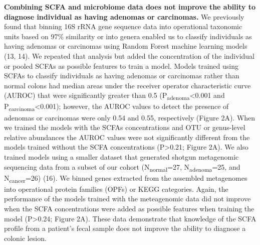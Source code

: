 \documentclass[11pt,]{article}
\begin{document}
\textbf{Combining SCFA and microbiome data does not improve the ability
to diagnose individual as having adenomas or carcinomas.} We previously
found that binning 16S rRNA gene sequence data into operational
taxonomic units based on 97\% similarity or into genera enabled us to
classify individuals as having adenomas or carcinomas using Random
Forest machine learning models (13, 14). We repeated that analysis but
added the concentration of the individual or pooled SCFAs as possible
features to train a model. Models trained using SCFAs to classify
individuals as having adenomas or carcinomas rather than normal colons
had median areas under the receiver operator characteristic curve
(AUROC) that were significantly greater than 0.5
(P\textsubscript{adenoma}\textless{}0.001 and
P\textsubscript{carcinoma}\textless{}0.001); however, the AUROC values
to detect the presence of adenomas or carcinomas were only 0.54 and
0.55, respectively (Figure 2A). When we trained the models with the
SCFAs concentrations and OTU or genus-level relative abundances the
AUROC values were not significantly different from the models trained
without the SCFA concentrations (P\textgreater{}0.21; Figure 2A). We
also trained models using a smaller dataset that generated shotgun
metagenomic sequencing data from a subset of our cohort
(N\textsubscript{normal}=27, N\textsubscript{adenoma}=25, and
N\textsubscript{cancer}=26) (16). We binned genes extracted from the
assembled metagenomes into operational protein families (OPFs) or KEGG
categories. Again, the performance of the models trained with the
meteagenomic data did not improve when the SCFA concentrations were
added as possible features when training the model (P\textgreater{}0.24;
Figure 2A). These data demonstrate that knowledge of the SCFA profile
from a patient's fecal sample does not improve the ability to diagnose a
colonic lesion.
\end{document}
